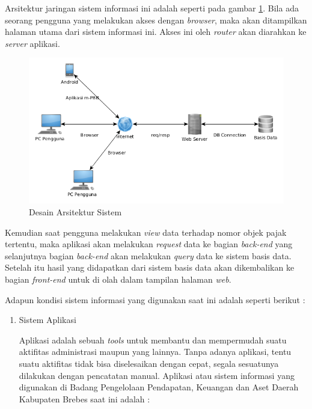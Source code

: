 \documentclass[pdftex,12pt, oneside]{article}
\begin{document}
\begin{enumerate}
\begin{enumerate}
Arsitektur jaringan sistem informasi ini adalah seperti pada gambar \ref{fig:001-arsitektur-sistem}. Bila ada seorang pengguna yang melakukan akses dengan \textit{browser}, maka akan ditampilkan halaman 	utama dari sistem informasi ini. Akses ini oleh \textit{router} akan diarahkan ke \textit{server} aplikasi.

\begin{figure}[H]
	\centering
	\includegraphics[width=1\textwidth]{./resources/arsitektur-sistem}
	\caption{Desain Arsitektur Sistem}
	\label{fig:001-arsitektur-sistem}
\end{figure}

Kemudian saat pengguna melakukan \textit{view} data terhadap nomor objek pajak tertentu, maka aplikasi akan melakukan \textit{request} data ke bagian \textit{back-end} yang selanjutnya bagian \textit{back-end} akan melakukan \textit{query} data ke sistem basis data. Setelah itu hasil yang didapatkan dari sistem basis data akan dikembalikan ke bagian \textit{front-end} untuk di olah dalam tampilan halaman \textit{web}.
	
\end{enumerate}

Adapun kondisi sistem informasi yang digunakan saat ini adalah seperti berikut :

\begin{enumerate}
	\item Sistem Aplikasi 
	
Aplikasi adalah sebuah \textit{tools} untuk membantu dan mempermudah suatu aktifitas administrasi maupun yang lainnya. Tanpa adanya aplikasi, tentu suatu aktifitas tidak bisa diselesaikan dengan cepat, segala sesuatunya dilakukan dengan pencatatan manual. Aplikasi atau sistem informasi yang digunakan di Badang Pengelolaan Pendapatan, Keuangan dan Aset Daerah Kabupaten Brebes saat ini adalah :


\end{enumerate}
\end{enumerate}
\end{document}
